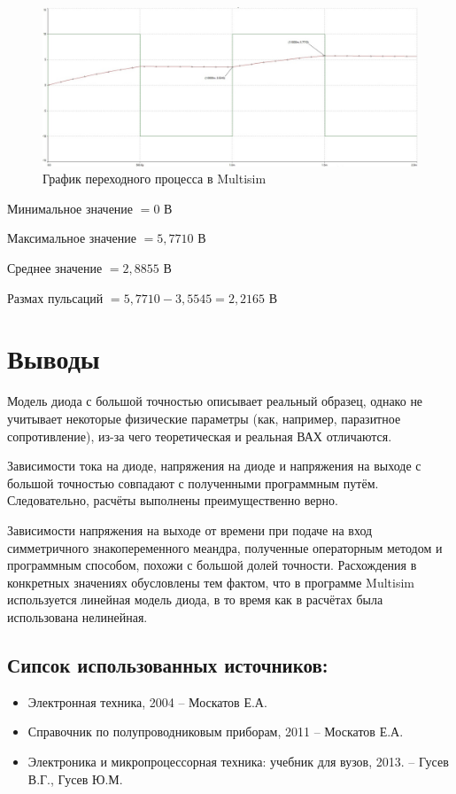 \documentclass{labreport}
\begin{document}
\begin{samepage}
\begin{figure}[h]
    \centering
    \includegraphics[width=\linewidth]{graph_x_m.jpg}
    \caption{График переходного процесса в Multisim}
\end{figure}

Минимальное значение $= 0$ В

Максимальное значение $= 5,7710$ В

Среднее значение $= 2,8855$ В

Размах пульсаций $= 5,7710 - 3,5545 = 2,2165$ В

\end{samepage}







\chapter{Выводы}
Модель диода с большой точностью описывает реальный образец, однако не учитывает некоторые физические параметры (как, например, паразитное сопротивление), из-за чего теоретическая и реальная ВАХ отличаются.

Зависимости тока на диоде, напряжения на диоде и напряжения на выходе с большой точностью совпадают с полученными программным путём. Следовательно, расчёты выполнены преимущественно верно.

Зависимости напряжения на выходе от времени при подаче на вход симметричного знакопеременного меандра, полученные операторным методом и программным способом, похожи с большой долей точности. Расхождения в конкретных значениях обусловлены тем фактом, что в программе Multisim используется линейная модель диода, в то время как в расчётах была использована нелинейная.
\section{Сипсок использованных источников:}

\begin{itemize}
    \item Электронная техника, 2004 -- Москатов Е.А. 
    \item Справочник по полупроводниковым приборам, 2011 -- Москатов Е.А. 
    \item Электроника и микропроцессорная техника: учебник для вузов, 2013. -- Гусев В.Г., Гусев Ю.М. 
\end{itemize}
    
\end{document}
